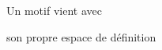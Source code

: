 \documentclass[preview]{standalone}
\begin{document}
\begin{center}
Un motif vient avec
        
son propre espace de définition
\end{center}
\end{document}
